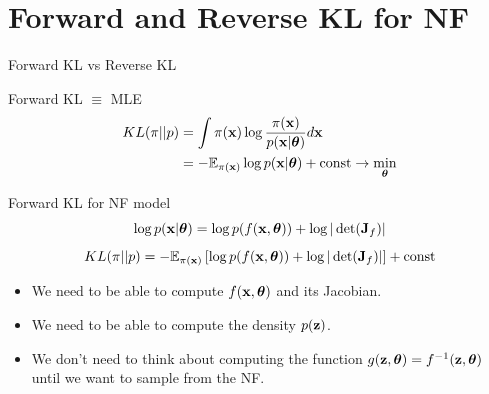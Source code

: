 \section{Forward and Reverse KL for NF}
\begin{frame}{Forward KL vs Reverse KL}
	\begin{block}{Forward KL $\equiv$ MLE}
		\vspace{-0.5cm}
		\begin{align*}
			KL(\pi || p) &= \int \pi (\mathbf{x}) \log \frac{\pi(\mathbf{x})}{p(\mathbf{x} | \boldsymbol{\theta})} d \mathbf{x} \\
			&= - \mathbb{E}_{\pi(\mathbf{x})} \log p(\mathbf{x} | \boldsymbol{\theta}) + \text{const} \rightarrow \min_{\boldsymbol{\theta}}
		\end{align*}
	\end{block}
	\begin{block}{Forward KL for NF model}
	    \vspace{-0.1cm}
		\[
			\log p(\mathbf{x}|\boldsymbol{\theta}) = \log p(f(\mathbf{x}, \boldsymbol{\theta})) + \log  |\det (\mathbf{J}_f)|
		\]		
		\[
			KL(\pi || p)  = - \mathbb{E}_{\pi(\mathbf{x})} \left[\log p(f(\mathbf{x}, \boldsymbol{\theta})) + \log  |\det (\mathbf{J}_f)|\right] + \text{const} 
		\]
		\vspace{-0.2cm}
		\begin{itemize}
			\item We need to be able to compute $f(\mathbf{x}, \boldsymbol{\theta})$ and its Jacobian.
			\item We need to be able to compute the density $p(\mathbf{z})$.
			\item We don’t need to think about computing the function $g(\mathbf{z}, \boldsymbol{\theta}) = f^{-1}(\mathbf{z}, \boldsymbol{\theta})$ until we want to sample from the NF.
		\end{itemize}
	\end{block}
\end{frame}
